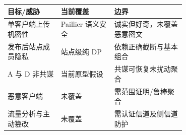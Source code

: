 \begin{tabular}{lp{0.30\linewidth}p{0.40\linewidth}}
\toprule
目标/威胁 & 当前覆盖 & 边界 \\
\midrule
单客户端上传机密性 & Paillier 语义安全 & 诚实但好奇，未覆盖恶意密文 \\
发布后站点成员隐私 & 站点级纯 DP & 依赖正确截断与基本组合 \\
A 与 D 非共谋 & 当前原型假设 & 共谋可恢复未扰动聚合 \\
恶意客户端 & 未覆盖 & 需范围证明/鲁棒聚合 \\
流量分析与主动篡改 & 未覆盖 & 需认证信道及侧信道防护 \\
\bottomrule
\end{tabular}
